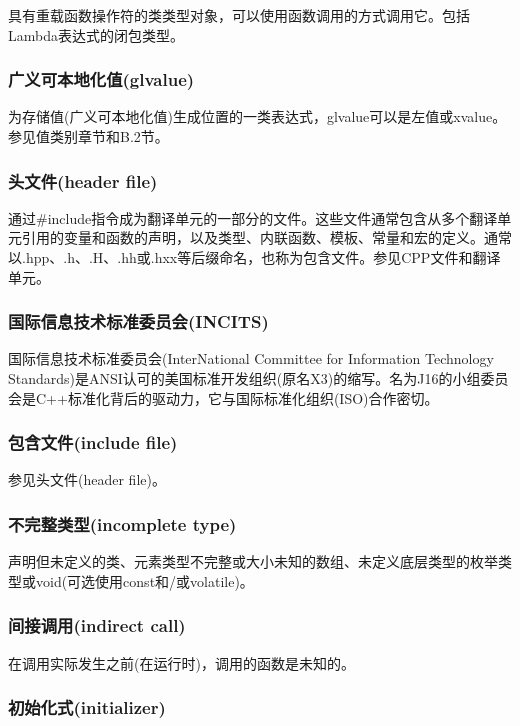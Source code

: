 具有重载函数操作符的类类型对象，可以使用函数调用的方式调用它。包括Lambda表达式的闭包类型。

\subsubsection{广义可本地化值(glvalue)}

为存储值(广义可本地化值)生成位置的一类表达式，glvalue可以是左值或xvalue。参见值类别章节和B.2节。

\subsubsection{头文件(header file)}

通过\#include指令成为翻译单元的一部分的文件。这些文件通常包含从多个翻译单元引用的变量和函数的声明，以及类型、内联函数、模板、常量和宏的定义。通常以.hpp、.h、.H、.hh或.hxx等后缀命名，也称为包含文件。参见CPP文件和翻译单元。

\subsubsection{国际信息技术标准委员会(INCITS)}

国际信息技术标准委员会(InterNational Committee for Information Technology Standards)是ANSI认可的美国标准开发组织(原名X3)的缩写。名为J16的小组委员会是C++标准化背后的驱动力，它与国际标准化组织(ISO)合作密切。

\subsubsection{包含文件(include file)}

参见头文件(header file)。

\subsubsection{不完整类型(incomplete type)}

声明但未定义的类、元素类型不完整或大小未知的数组、未定义底层类型的枚举类型或void(可选使用const和/或volatile)。

\subsubsection{间接调用(indirect call)}

在调用实际发生之前(在运行时)，调用的函数是未知的。

\subsubsection{初始化式(initializer)}

